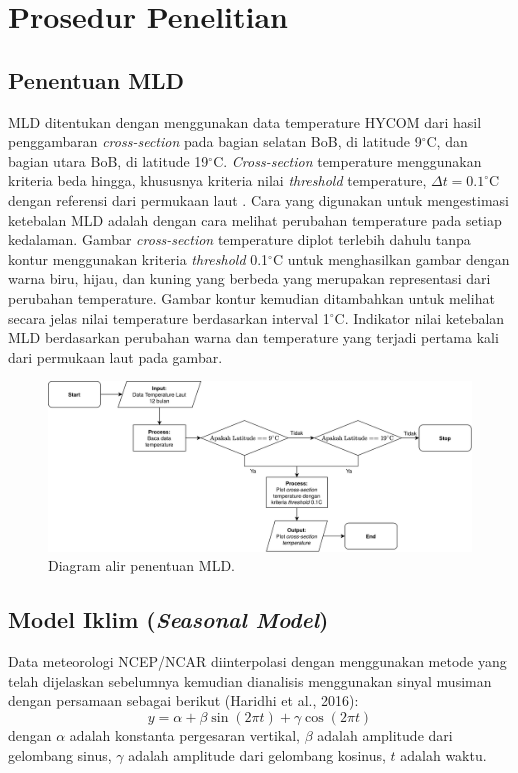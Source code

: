 \vspace{-0.5pc}
\section[Prosedur Penelitian]{Prosedur Penelitian}
\subsection[Penentuan MLD]{Penentuan MLD}
\begin{spacing}{1.5}
	MLD ditentukan dengan menggunakan data temperature HYCOM dari hasil penggambaran \textit{cross-section} pada bagian selatan BoB, di latitude 9$^\circ$C, dan bagian utara BoB, di latitude 19$^\circ$C. \textit{Cross-section} temperature menggunakan kriteria beda hingga, khususnya kriteria nilai \textit{threshold} temperature, $\Delta t=0.1^\circ$C dengan referensi dari permukaan laut . Cara yang digunakan untuk mengestimasi ketebalan MLD adalah dengan cara melihat perubahan temperature pada setiap kedalaman. Gambar \textit{cross-section} temperature diplot terlebih dahulu tanpa kontur menggunakan kriteria \textit{threshold} 0.1$^\circ$C untuk menghasilkan gambar dengan warna biru, hijau, dan kuning yang berbeda yang merupakan representasi dari perubahan temperature. Gambar kontur kemudian ditambahkan untuk melihat secara jelas nilai temperature berdasarkan interval 1$^\circ$C. Indikator nilai ketebalan MLD berdasarkan perubahan warna dan temperature yang terjadi pertama kali dari permukaan laut pada gambar.
	
	\begin{figure}[H]
		\centering
		\includegraphics[width=14cm]{contents/Flowchart_1.png}
		\caption{Diagram alir penentuan MLD.}
		\label{fig:flowchart_1}
	\end{figure}
\subsection[Model Iklim (\textit{Seasonal Model})]{Model Iklim (\textit{Seasonal Model})}
	Data meteorologi NCEP/NCAR diinterpolasi dengan menggunakan metode yang telah dijelaskan sebelumnya kemudian dianalisis menggunakan sinyal musiman dengan persamaan sebagai berikut (Haridhi et al., 2016):
	\begin{equation}\label{eq:sm}
		y = \alpha + \beta \sin(2\pi t)+\gamma \cos(2\pi t)
	\end{equation}
	dengan $\alpha$ adalah konstanta pergesaran vertikal, $\beta$ adalah amplitude dari gelombang sinus, $\gamma$ adalah amplitude dari gelombang kosinus, $t$ adalah waktu.
	

\end{spacing}
